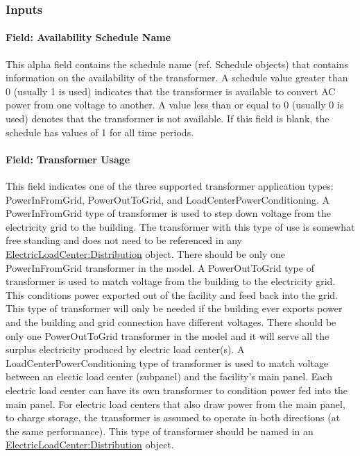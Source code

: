 \subsubsection{Inputs}\label{inputs-014}

\paragraph{Field: Availability Schedule Name}\label{field-availability-schedule-name-005}

This alpha field contains the schedule name (ref. Schedule objects) that contains information on the availability of the transformer. A schedule value greater than 0 (usually 1 is used) indicates that the transformer is available to convert AC power from one voltage to another. A value less than or equal to 0 (usually 0 is used) denotes that the transformer is not available. If this field is blank, the schedule has values of 1 for all time periods.

\paragraph{Field: Transformer Usage}\label{field-transformer-usage}

This field indicates one of the three supported transformer application types: PowerInFromGrid, PowerOutToGrid, and LoadCenterPowerConditioning. A PowerInFromGrid type of transformer is used to step down voltage from the electricity grid to the building. The transformer with this type of use is somewhat free standing and does not need to be referenced in any \hyperref[electricloadcenterdistribution]{ElectricLoadCenter:Distribution} object. There should be only one PowerInFromGrid transformer in the model. A PowerOutToGrid type of transformer is used to match voltage from the building to the electricity grid. This conditions power exported out of the facility and feed back into the grid. This type of transformer will only be needed if the building ever exports power and the building and grid connection have different voltages. There should be only one PowerOutToGrid transformer in the model and it will serve all the surplus electricity produced by electric load center(s). A LoadCenterPowerConditioning type of transformer is used to match voltage between an electic load center (subpanel) and the facility's main panel. Each electric load center can have its own transformer to condition power fed into the main panel. For electric load centers that also draw power from the main panel, to charge storage, the transformer is assumed to operate in both directions (at the same performance). This type of transformer should be named in an \hyperref[electricloadcenterdistribution]{ElectricLoadCenter:Distribution} object.

